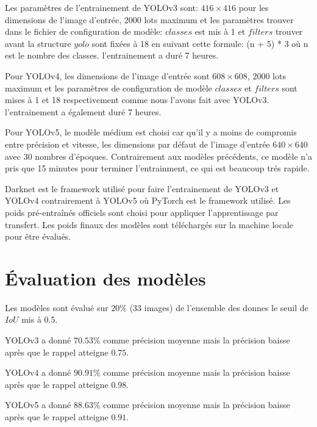      Les paramètres de l'entrainement de YOLOv3 sont: $416\times416$ pour les dimensions de l'image d'entrée, $2000$ lots maximum et les paramètres trouver dans le fichier de configuration de modèle: $classes$ est mis à 1 et $filters$ trouver avant la structure $yolo$ sont fixées à 18 en suivant cette formule: (n + 5) * 3 où n est le nombre des classes. l'entrainement a duré 7 heures.
     
     Pour YOLOv4, les dimensions de l'image d'entrée sont $608\times608$, 2000 lots maximum et les paramètres de configuration de modèle $classes$ et $filters$ sont mises à 1 et 18 respectivement comme nous l'avons fait avec YOLOv3. l'entrainement a également duré 7 heures.
     
     Pour YOLOv5, le modèle médium est choisi car qu'il y a moins de compromis entre précision et vitesse, les dimensions par défaut de l'image d'entrée $640\times640$ avec 30 nombres d'époques. Contrairement aux modèles précédents, ce modèle n'a pris que 15 minutes pour terminer l'entrainment, ce qui est beaucoup trés rapide.

     Darknet est le framework utilisé pour faire l'entrainement de YOLOv3 et YOLOv4 contrairement à YOLOv5 où PyTorch est le framework utilisé. Les poids pré-entraînés officiels sont choisi pour appliquer l'apprentissage par transfert. Les poids finaux des modèles sont téléchargés sur la machine locale pour être évalués.
     

\section{Évaluation des modèles}
     Les modèles sont évalué sur $20\%$ (33 images) de l'ensemble des donnes le seuil de $IoU$ mis à 0.5.
     
     YOLOv3 a donné $70.53\%$ comme précision moyenne mais la précision baisse après que le rappel atteigne $0.75$.

     YOLOv4 a donné $90.91\%$ comme précision moyenne mais la précision baisse après que le rappel atteigne $0.98$.

     YOLOv5 a donné $88.63\%$ comme précision moyenne mais la précision baisse après que le rappel atteigne $0.91$.
     
